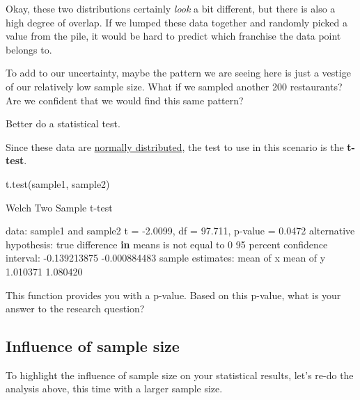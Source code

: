 \documentclass[
]{book}
\newenvironment{Shaded}{\begin{snugshade}}{\end{snugshade}}
\newcommand{\ControlFlowTok}[1]{\textcolor[rgb]{0.13,0.29,0.53}{\textbf{#1}}}
\newcommand{\DecValTok}[1]{\textcolor[rgb]{0.00,0.00,0.81}{#1}}
\newcommand{\FloatTok}[1]{\textcolor[rgb]{0.00,0.00,0.81}{#1}}
\newcommand{\FunctionTok}[1]{\textcolor[rgb]{0.00,0.00,0.00}{#1}}
\newcommand{\NormalTok}[1]{#1}
\newcommand{\OtherTok}[1]{\textcolor[rgb]{0.56,0.35,0.01}{#1}}
\newcommand{\SpecialCharTok}[1]{\textcolor[rgb]{0.00,0.00,0.00}{#1}}
\begin{document}
Okay, these two distributions certainly \emph{look} a bit different, but there is also a high degree of overlap. If we lumped these data together and randomly picked a value from the pile, it would be hard to predict which franchise the data point belongs to.

To add to our uncertainty, maybe the pattern we are seeing here is just a vestige of our relatively low sample size. What if we sampled another 200 restaurants? Are we confident that we would find this same pattern?

Better do a statistical test.

Since these data are \href{https://www.mathsisfun.com/data/standard-normal-distribution.html}{normally distributed}, the test to use in this scenario is the \textbf{t-test}.

\begin{Shaded}
\begin{Highlighting}[]
\FunctionTok{t.test}\NormalTok{(sample1, }
\NormalTok{       sample2)}

\NormalTok{    Welch Two Sample t}\SpecialCharTok{{-}}\NormalTok{test}

\NormalTok{data}\SpecialCharTok{:}\NormalTok{  sample1 and sample2}
\NormalTok{t }\OtherTok{=} \SpecialCharTok{{-}}\FloatTok{2.0099}\NormalTok{, df }\OtherTok{=} \FloatTok{97.711}\NormalTok{, p}\SpecialCharTok{{-}}\NormalTok{value }\OtherTok{=} \FloatTok{0.0472}
\NormalTok{alternative hypothesis}\SpecialCharTok{:}\NormalTok{ true difference }\ControlFlowTok{in}\NormalTok{ means is not equal to }\DecValTok{0}
\DecValTok{95}\NormalTok{ percent confidence interval}\SpecialCharTok{:}
 \SpecialCharTok{{-}}\FloatTok{0.139213875} \SpecialCharTok{{-}}\FloatTok{0.000884483}
\NormalTok{sample estimates}\SpecialCharTok{:}
\NormalTok{mean of x mean of y }
 \FloatTok{1.010371}  \FloatTok{1.080420} 
\end{Highlighting}
\end{Shaded}

This function provides you with a p-value. Based on this p-value, what is your answer to the research question?

\hypertarget{influence-of-sample-size}{%
\subsection*{Influence of sample size}\label{influence-of-sample-size}}

To highlight the influence of sample size on your statistical results, let's re-do the analysis above, this time with a larger sample size.
\end{document}
